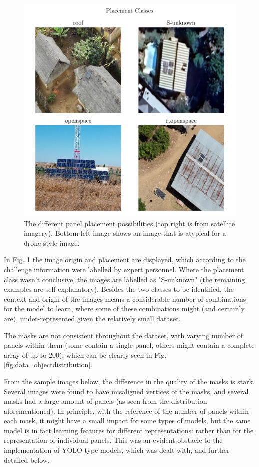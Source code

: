 \documentclass[conference]{IEEEtran}
\begin{document}
\begin{figure}[H]
    \centering
    \includegraphics[width=1\linewidth]{assets/data_placement_classes.png}
    \caption{The different panel placement possibilities (top right is from satellite imagery). Bottom left image shows an image that is atypical for a drone style image.}
    \label{fig:data_placement_classes}
\end{figure}

In Fig. \ref{fig:data_placement_classes} the image origin and placement are displayed, which according to the challenge information were labelled by expert personnel. Where the placement class wasn't conclusive, the images are labelled as "S-unknown" (the remaining examples are self explanatory). Besides the two classes to be identified, the context and origin of the images means a considerable number of combinations for the model to learn, where some of these combinations might (and certainly are), under-represented given the relatively small dataset.

The masks are not consistent throughout the dataset, with varying number of panels within them (some contain a single panel, others might contain a complete array of up to 200), which can be clearly seen in Fig. \ref{fig:data_objectdistribution}.

From the sample images below, the difference in the quality of the masks is stark. Several images were found to have misaligned vertices of the masks, and several masks had a large amount of panels (as seen from the distribution aforementioned). In principle, with the reference of the number of panels within each mask, it might have a small impact for some types of models, but the same model is in fact learning features for different representations: rather than for the representation of individual panels. This was an evident obstacle to the implementation of YOLO type models, which was dealt with, and further detailed below.
\end{document}
